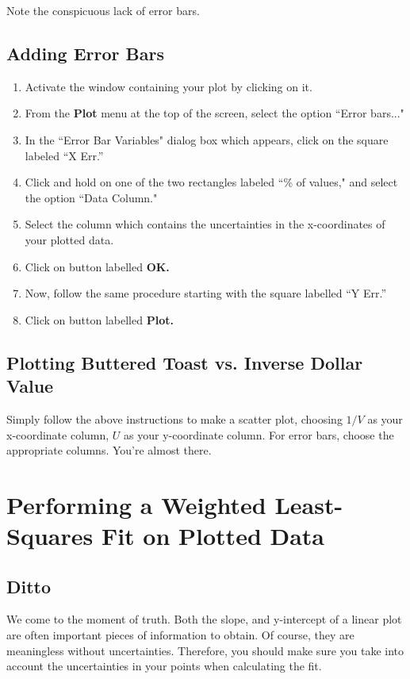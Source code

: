 \documentclass[12pt]{article}
\begin{document}
Note the conspicuous lack of error bars.

\subsection{Adding Error Bars}

\noindent
\begin{enumerate}
\item Activate the window containing your plot by clicking on it.
\item From the {\bf Plot} menu at the top of the screen, select the option ``Error
bars..."
\item In the ``Error Bar Variables" dialog box which appears, click on the square
labeled ``X Err.''
\item Click and hold on one of the two rectangles labeled ``\% of values," and select
the option ``Data Column." 
\item Select the column which contains the uncertainties in the x-coordinates of your
plotted data. 
\item Click on button labelled {\bf OK.}
\item Now, follow the same procedure starting with the square labelled ``Y Err.''
\item Click on button labelled {\bf Plot.}
\end{enumerate}
\indent

\subsection{Plotting Buttered Toast vs. Inverse Dollar Value}

Simply follow the above instructions to make a scatter plot, choosing $1/V$ as your
x-coordinate column, $U$ as your y-coordinate column. For error bars, choose the
appropriate columns. You're almost there.

\section{Performing a Weighted Least-Squares Fit on Plotted Data}
\subsection{Ditto}

We come to the moment of truth. Both the slope, and y-intercept of a linear plot are
often important pieces of information to obtain. Of course, they are meaningless without
uncertainties. Therefore, you should make sure you take into account the uncertainties in your
points when calculating the fit. 
\end{document}
